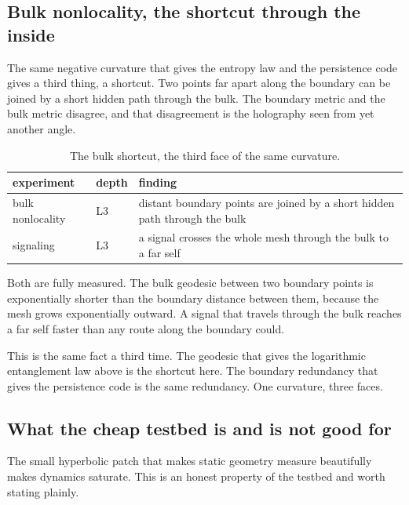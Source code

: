 \subsection{Bulk nonlocality, the shortcut through the inside}

The same negative curvature that gives the entropy law and the persistence code gives a third thing, a shortcut. Two points far apart along the boundary can be joined by a short hidden path through the bulk. The boundary metric and the bulk metric disagree, and that disagreement is the holography seen from yet another angle.

\begin{table}[ht]
\centering
\begin{tabular}{@{}lll@{}}
\toprule
experiment & depth & finding \\
\midrule
bulk nonlocality & L3 & distant boundary points are joined by a short hidden path through the bulk \\
signaling & L3 & a signal crosses the whole mesh through the bulk to a far self \\
\bottomrule
\end{tabular}
\caption{The bulk shortcut, the third face of the same curvature.}
\label{tab:hol-nonlocal}
\end{table}

Both are fully measured. The bulk geodesic between two boundary points is exponentially shorter than the boundary distance between them, because the mesh grows exponentially outward. A signal that travels through the bulk reaches a far self faster than any route along the boundary could.

This is the same fact a third time. The geodesic that gives the logarithmic entanglement law above is the shortcut here. The boundary redundancy that gives the persistence code is the same redundancy. One curvature, three faces.

\subsection{What the cheap testbed is and is not good for}

The small hyperbolic patch that makes static geometry measure beautifully makes dynamics saturate. This is an honest property of the testbed and worth stating plainly.

